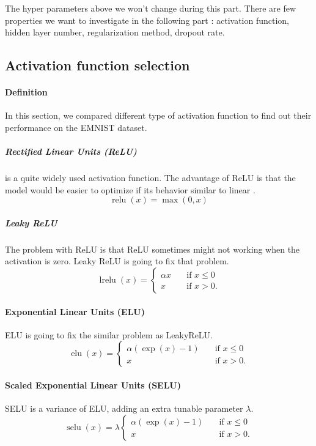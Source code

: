 \documentclass{article}
\DeclareMathOperator{\relu}{relu}
\DeclareMathOperator{\lrelu}{lrelu}
\DeclareMathOperator{\elu}{elu}
\DeclareMathOperator{\selu}{selu}
\begin{document}
The hyper parameters above we won't change during this part. There are few properties we want to investigate in the following part : activation function, hidden layer number, regularization method, dropout rate.

\subsection{Activation function selection}

\paragraph{Definition}

In this section, we compared different type of activation function to find out their performance on the EMNIST dataset.
\subparagraph {Rectified Linear Units (ReLU)} \citep{icml2010_NairH10} is a quite widely used activation function. The advantage of ReLU is that the model would be easier to optimize if its behavior similar to linear \citep{Goodfellow-et-al-2016}.
 $$\relu(x) = \max(0, x)$$

\subparagraph {Leaky ReLU} \citep{Maas13rectifiernonlinearities} The problem with ReLU is that ReLU sometimes might not working when the activation is zero. Leaky ReLU is going to fix that problem.
$$	\lrelu(x) = 
	\begin{cases} 
      \alpha x      & \quad \text{if } x \leq  0 \\
      x      & \quad \text{if } x > 0 .
    \end{cases} 
$$


\paragraph{Exponential Linear Units (ELU)}
ELU\citep{2015arXiv151107289C} is going to fix the similar problem as LeakyReLU.
$$	\elu(x) = 
	\begin{cases} 
      \alpha (\exp(x)-1)      & \quad \text{if } x \leq  0 \\
      x      & \quad \text{if } x > 0 .
    \end{cases} $$
    

\paragraph{Scaled Exponential Linear Units (SELU)}
SELU \citep{2017arXiv170602515K} is a variance of ELU, adding an extra tunable parameter  $\lambda$.
$$
	\selu(x) = \lambda
	\begin{cases} 
      \alpha (\exp(x)-1)      & \quad \text{if } x \leq  0 \\
      x      & \quad \text{if } x > 0 .
    \end{cases} 
$$
\end{document}
